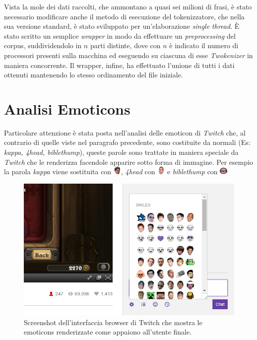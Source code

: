 \documentclass[a4paper,12pt,openright,twoside]{report}
\theoremstyle{definition}
\begin{document}
Vista la mole dei dati raccolti, che ammontano a quasi sei milioni di frasi, è stato necessario modificare anche il metodo di esecuzione del tokenizzatore, 
che nella sua versione standard, è stato sviluppato per un'elaborazione \emph{single thread}.
\`E stato scritto un semplice \emph{wrapper} in modo da effettuare un \emph{preprocessing} del corpus, 
suddividendolo in $n$ parti distinte, dove con $n$ è indicato il numero di processori presenti 
sulla macchina ed
eseguendo su ciascuna di esse \emph{Twokenizer} in maniera concorrente.
Il wrapper, infine, ha effettuato l'unione di tutti i dati ottenuti mantenendo lo stesso 
ordinamento del file iniziale.
\newpage
\section{Analisi Emoticons}
Particolare attenzione è stata posta nell'analisi delle emoticon di \emph{Twitch} che,
al contrario di quelle viste nel paragrafo precedente, sono costituite da normali (Es: \emph{kappa, 4head, biblethump}),
queste parole sono trattate in maniera speciale da \emph{Twitch} che le renderizza facendole apparire sotto forma di immagine.
Per esempio la parola \emph{kappa} viene sostituita con 
\includegraphics[height=0.4cm, width=0.4cm]{Immagini/Emoticons/kappahd.png}, 
\emph{4head} con \includegraphics[height=0.4cm, width=0.4cm]{Immagini/Emoticons/4head.png} e 
\emph{biblethump} con
\includegraphics[height=0.4cm, width=0.4cm]{Immagini/Emoticons/biblethump.png} 

\begin{figure}[ht]
	\centering
	\includegraphics[scale=0.5]{Immagini/TwitchEmotes.jpg}
	\caption{Screenshot dell'interfaccia browser di Twitch che mostra le emoticons renderizzate
	come appaiono all'utente finale.}
	\label{fig:TwitchEmotes}
\end{figure}
\end{document}
